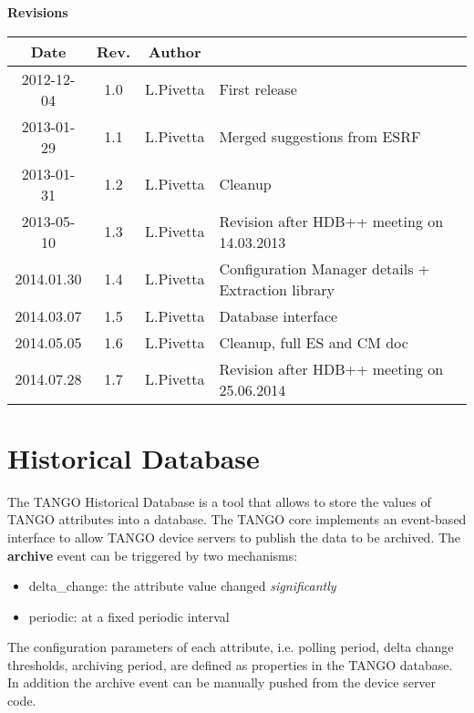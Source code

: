 \documentclass[11pt,a4paper]{article}
\def \cm{Configuration Manager}
\def \tango{TANGO}
\begin{document}
\begin{Large}
	\textbf{Revisions}
\end{Large}
\begin{table}[!htb]
	\begin{tabular}{|c|c|c|l|}
		\hline
		\bf{Date} & \bf{Rev.} & \bf{Author} & \\
		\hline
		2012-12-04 & 1.0 & L.Pivetta & First release \\
		2013-01-29 & 1.1 & L.Pivetta & Merged suggestions from ESRF \\
		2013-01-31 & 1.2 & L.Pivetta & Cleanup \\
		2013-05-10 & 1.3 & L.Pivetta & Revision after HDB++ meeting on 14.03.2013 \\
		2014.01.30 & 1.4 & L.Pivetta & \cm{} details + Extraction library \\
		2014.03.07 & 1.5 & L.Pivetta & Database interface \\
		2014.05.05 & 1.6 & L.Pivetta & Cleanup, full ES and CM doc \\
		2014.07.28 & 1.7 & L.Pivetta & Revision after HDB++ meeting on 25.06.2014 \\
	\hline
	\end{tabular}
	\label{revisions}
\end{table}

\newpage{\clearpage}

\tableofcontents

\newpage{\clearpage}

\listoftables

\newpage{\clearpage}

\section{Historical Database}
The \tango{} Historical Database is a tool that allows to store the values
of \tango{} attributes into a database. The \tango{} core implements an
event-based interface to allow \tango{} device servers to publish the data
to be archived. The \textbf{archive} event can be triggered by two mechanisms:
\begin{itemize}
	\item delta\_change: the attribute value changed \emph{significantly}
	\item periodic: at a fixed periodic interval
\end{itemize}
The configuration parameters of each attribute, i.e. polling period, 
delta change thresholds, archiving period, are defined as properties
in the \tango{} database. In addition the archive event can be manually
pushed from the device server code.
\end{document}
